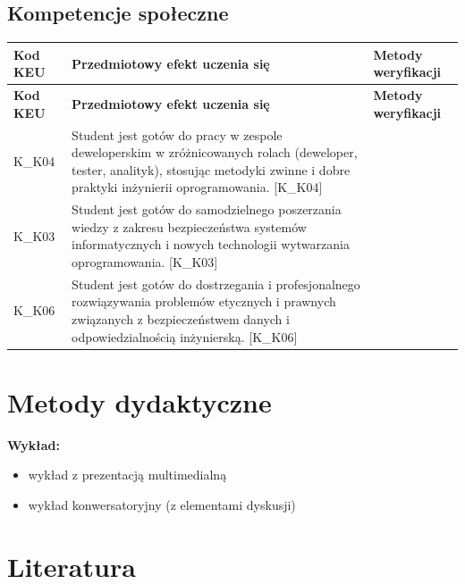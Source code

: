 \documentclass[12pt, a4paper]{article}
\newcommand{\thdrule}{\noalign{\global\setlength{\extrarowheight}{0pt}}}
\newcommand{\thdend}{\noalign{\global\setlength{\extrarowheight}{3pt}}}
\begin{document}
\subsection*{Kompetencje społeczne}
{\scriptsize
\begin{longtable}{m{1.6cm}m{9.0cm}m{4.2cm}}
\thdrule\toprule
\rowcolor{pjatkRed} {\color{white}\footnotesize\textbf{\vphantom{Ag}Kod KEU}} & {\color{white}\footnotesize\textbf{\vphantom{Ag}Przedmiotowy efekt uczenia się}} & {\color{white}\footnotesize\textbf{\vphantom{Ag}Metody weryfikacji}} \\
\midrule\thdend
\endfirsthead
\thdrule\toprule
\rowcolor{pjatkRed} {\color{white}\footnotesize\textbf{\vphantom{Ag}Kod KEU}} & {\color{white}\footnotesize\textbf{\vphantom{Ag}Przedmiotowy efekt uczenia się}} & {\color{white}\footnotesize\textbf{\vphantom{Ag}Metody weryfikacji}} \\
\midrule\thdend
\endhead
  \rowcolor{tableRowLight} K\_K04 & Student jest gotów do pracy w zespole deweloperskim w zróżnicowanych rolach (deweloper, tester, analityk), stosując metodyki zwinne i dobre praktyki inżynierii oprogramowania. {[}K\_K04{]} &  \\
  \rowcolor{tableRowAlt} K\_K03 & Student jest gotów do samodzielnego poszerzania wiedzy z zakresu bezpieczeństwa systemów informatycznych i nowych technologii wytwarzania oprogramowania. {[}K\_K03{]} &  \\
  \rowcolor{tableRowLight} K\_K06 & Student jest gotów do dostrzegania i profesjonalnego rozwiązywania problemów etycznych i prawnych związanych z bezpieczeństwem danych i odpowiedzialnością inżynierską. {[}K\_K06{]} &  \\
\bottomrule
\end{longtable}}

\section{Metody dydaktyczne}

\textbf{Wykład:}
\begin{itemize}
  \item wykład z prezentacją multimedialną
  \item wykład konwersatoryjny (z elementami dyskusji)
\end{itemize}
\vspace{4pt}


\section{Literatura}
\end{document}
